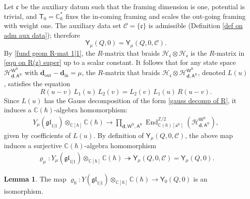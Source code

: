 \documentclass[10pt]{amsart}
\theoremstyle{definition}
\newtheorem{Lemma}[Theorem]{Lemma}
\numberwithin{equation}{section}
\newcommand{\bC}{\mathbb{C}}
\newcommand{\bZ}{\mathbb{Z}}
\newcommand{\bd}{\mathbf{d}}
\newcommand{\cC}{\mathcal{C}}
\newcommand{\cH}{\mathcal{H}}
\newcommand{\sA}{\mathsf{A}}
\newcommand{\sT}{\mathsf{T}}
\newcommand{\sW}{\mathsf{W}}
\newcommand{\End}{\operatorname{End}}
\newcommand{\In}{\operatorname{in}}
\newcommand{\Out}{\operatorname{out}}
\begin{document}
Let $\mathfrak{c}$ be the auxiliary datum such that the framing dimension is one, potential is trivial, and $\sT_0=\bC^*_\hbar$ fixes the in-coming framing and scales the out-going framing with weight one. The auxiliary data set $\mathcal C=\{\mathfrak{c}\}$ is admissible (Definition \ref{def on adm aux data}); therefore $$\mathsf Y_\mu(Q,0)=\mathsf Y_\mu(Q,0,\cC).$$ 
By \eqref{fund geom R-mat 1|1}, the $R$-matrix that braids $\cH_{\mathfrak{c}}\otimes \cH_{\mathfrak{c}}$ is the $R$-matrix in \eqref{equ on R(z) super} up to a scalar constant. It follows that for any state space $\cH^{\sW^{\mathrm{fr}}}_{\underline{\bd},\sA^{\mathrm{fr}}}$ with $\bd_{\Out}-\bd_{\In}=\mu$, the $R$-matrix that braids $\cH_{\mathfrak{c}}\otimes \cH^{\sW^{\mathrm{fr}}}_{\underline{\bd},\sA^{\mathrm{fr}}}$, denoted $L(u)$, satisfies the equation 
$$R(u-v)\,L_1(u)\,L_2(v)=L_2(v)\,L_1(u)\,R(u-v).$$ 
Since $L(u)$ has the Gauss decomposition of the form \eqref{gauss decomp of R}, it induces a $\bC(\hbar)$-algebra homomorphism:
\begin{align*}
Y_\mu(\mathfrak{gl}_{1|1})\otimes_{\bC[\hbar]}\bC(\hbar)\to \prod_{\underline{\bd},\sW^{\mathrm{fr}},\sA^{\mathrm{fr}}}\End^{\bZ/2}_{\bC(\hbar)[\mathsf a^{\mathrm{fr}}]}(\cH^{\sW^{\mathrm{fr}}}_{\underline{\bd},\sA^{\mathrm{fr}}}),
\end{align*}
given by coefficients of $L(u)$. By definition of $\mathsf Y_\mu(Q,0,\cC)$, the above map induces a surjective $\bC(\hbar)$-algebra homomorphism
\begin{align}
\varrho_\mu\colon Y_\mu(\mathfrak{gl}_{1|1})\otimes_{\bC[\hbar]}\bC(\hbar)\twoheadrightarrow \mathsf Y_\mu(Q,0,\cC)=\mathsf Y_\mu(Q,0).
\end{align}


\begin{Lemma}\label{lem rho_0 isom}
The map $\varrho_0\colon Y(\mathfrak{gl}_{1|1})\otimes_{\bC[\hbar]}\bC(\hbar)\to\mathsf Y_0(Q,0)$ is an isomorphism.
\end{Lemma}
\end{document}
